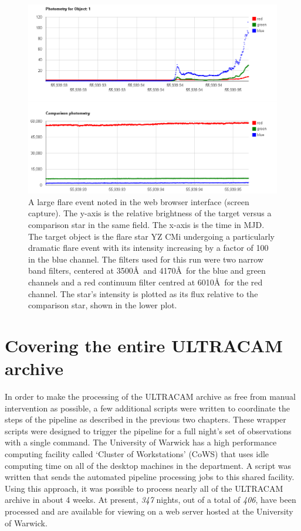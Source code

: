 \begin{figure}
\centering
\includegraphics[width=150mm]{images/ultraflare-on-YZCMi.png}
\caption{A large flare event noted in the web browser interface (screen capture). The y-axis is the relative brightness of the target versus a comparison star in the same field. The x-axis is the time in MJD. The target object is the flare star YZ CMi undergoing a particularly dramatic flare event with its intensity increasing by a factor of 100 in the blue channel. The filters used for this run were two narrow band filters, centered at 3500\AA\  and 4170\AA\  for the blue and green channels and a red continuum filter centred at 6010\AA\  for the red channel. The star's intensity is plotted as its flux relative to the comparison star, shown in the lower plot.}
\label{fig:ultraflare-web}
\end{figure}


\section{Covering the entire ULTRACAM archive}
In order to make the processing of the ULTRACAM archive as free from manual intervention as possible, a few additional scripts were written to coordinate the steps of the pipeline as described in the previous two chapters. These wrapper scripts were designed to trigger the pipeline for a full night's set of observations with a single command. The University of Warwick has a high performance computing facility called `Cluster of Workstations' (CoWS) that uses idle computing time on all of the desktop machines in the department. A script was written that sends the automated pipeline processing jobs to this shared facility. Using this approach, it was possible to process nearly all of the ULTRACAM archive in about 4 weeks. At present, \emph{347} nights, out of a total of \emph{406}, have been processed and are available for viewing on a web server hosted at the University of Warwick. 

